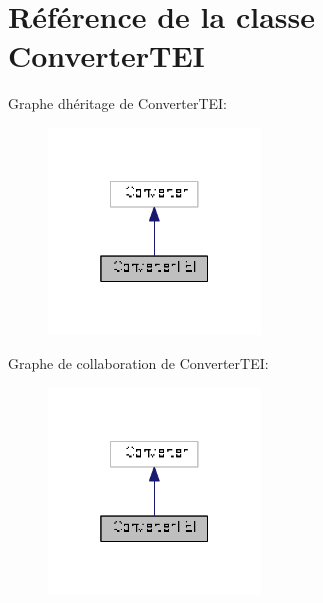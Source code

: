 \hypertarget{class_converter_t_e_i}{}\section{Référence de la classe Converter\+T\+EI}
\label{class_converter_t_e_i}


Graphe d\textquotesingle{}héritage de Converter\+T\+EI\+:
\nopagebreak
\begin{figure}[H]
\begin{center}
\leavevmode
\includegraphics[width=160pt]{class_converter_t_e_i__inherit__graph}
\end{center}
\end{figure}


Graphe de collaboration de Converter\+T\+EI\+:
\nopagebreak
\begin{figure}[H]
\begin{center}
\leavevmode
\includegraphics[width=160pt]{class_converter_t_e_i__coll__graph}
\end{center}
\end{figure}
